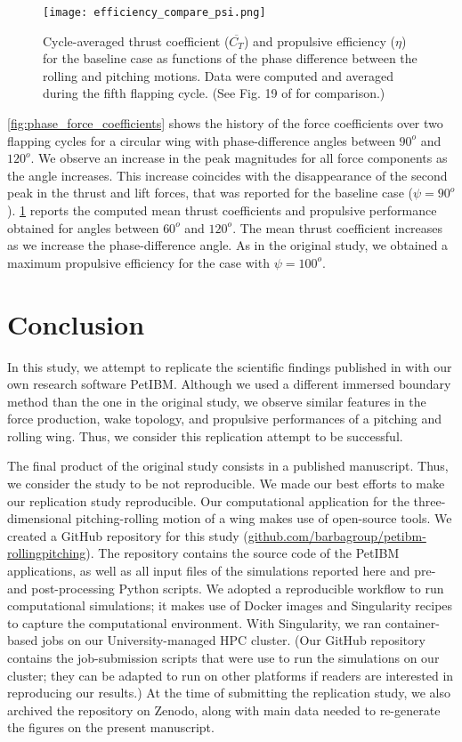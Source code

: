 \begin{figure}[!h]
  \centering
  \texttt{[image: efficiency\_compare\_psi.png]}
  \caption{Cycle-averaged thrust coefficient ($\overline{C_T}$) and propulsive efficiency ($\eta$) for the baseline case as functions of the phase difference between the rolling and pitching motions. Data were computed and averaged during the fifth flapping cycle. (See Fig. 19 of \citet{li_dong_2016} for comparison.)}
  \label{fig:phase_efficiency}
\end{figure}

\cref{fig:phase_force_coefficients} shows the history of the force coefficients over two flapping cycles for a circular wing with phase-difference angles between $90^o$ and $120^o$.
We observe an increase in the peak magnitudes for all force components as the angle increases.
This increase coincides with the disappearance of the second peak in the thrust and lift forces, that was reported for the baseline case ($\psi = 90^o$).
\cref{fig:phase_efficiency} reports the computed mean thrust coefficients and propulsive performance obtained for angles between $60^o$ and $120^o$.
The mean thrust coefficient increases as we increase the phase-difference angle.
As in the original study, we obtained a maximum propulsive efficiency for the case with $\psi = 100^o$.

\section{Conclusion}

In this study, we attempt to replicate the scientific findings published in \citet{li_dong_2016} with our own research software PetIBM\supercite{chuang_et_al_2018}.
Although we used a different immersed boundary method than the one in the original study, we observe similar features in the force production, wake topology, and propulsive performances of a pitching and rolling wing.
Thus, we consider this replication attempt to be successful.

The final product of the original study consists in a published manuscript.
Thus, we consider the study to be not reproducible.
We made our best efforts to make our replication study reproducible.
Our computational application for the three-dimensional pitching-rolling motion of a wing makes use of open-source tools.
We created a GitHub repository for this study (\url{github.com/barbagroup/petibm-rollingpitching}).
The repository contains the source code of the PetIBM applications, as well as all input files of the simulations reported here and pre- and post-processing Python scripts.
We adopted a reproducible workflow to run computational simulations; it makes use of Docker images and Singularity recipes to capture the computational environment.
With Singularity, we ran container-based jobs on our University-managed HPC cluster.
(Our GitHub repository contains the job-submission scripts that were use to run the simulations on our cluster; they can be adapted to run on other platforms if readers are interested in reproducing our results.)
At the time of submitting the replication study, we also archived the repository on Zenodo, along with main data needed to re-generate the figures on the present manuscript.
